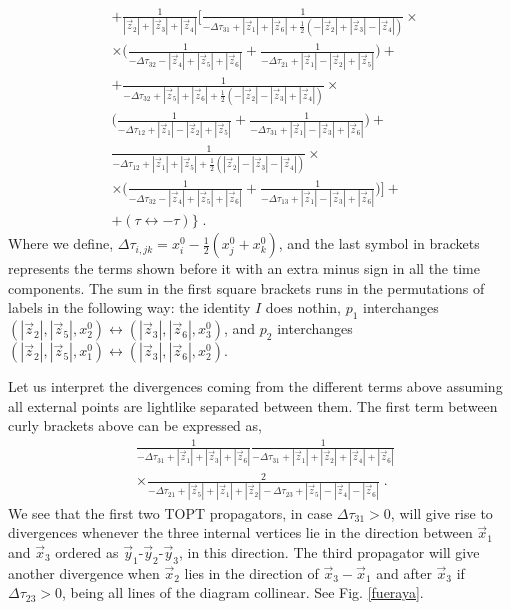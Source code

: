 \documentclass[%
 reprint,
 amsmath,amssymb,
 aps,
]{revtex4-1}
\begin{document}
\begin{align}
&+\frac{1}{|\vec{z}_2|+|\vec{z}_3|+|\vec{z}_4|}\Big[\frac{1}{-\Delta\tau_{31}+|\vec{z}_1|+|\vec{z}_6|+\frac{1}{2}(-|\vec{z}_2|+|\vec{z}_3|-|\vec{z}_4|)}\times\nonumber\\
&\times\Big(\frac{1}{-\Delta\tau_{32}-|\vec{z}_4|+|\vec{z}_5|+|\vec{z}_6|}+\frac{1}{-\Delta\tau_{21}+|\vec{z}_1|-|\vec{z}_2|+|\vec{z}_5|}\Big)+\nonumber\\
&+\frac{1}{-\Delta\tau_{32}+|\vec{z}_5|+|\vec{z}_6|+\frac{1}{2}(-|\vec{z}_2|-|\vec{z}_3|+|\vec{z}_4|)}\times\nonumber\\
&\Big(\frac{1}{-\Delta\tau_{12}+|\vec{z}_1|-|\vec{z}_2|+|\vec{z}_5|}+\frac{1}{-\Delta\tau_{31}+|\vec{z}_1|-|\vec{z}_3|+|\vec{z}_6|}\Big)+\nonumber\\
&\frac{1}{-\Delta\tau_{12}+|\vec{z}_1|+|\vec{z}_5|+\frac{1}{2}(|\vec{z}_2|-|\vec{z}_3|-|\vec{z}_4|)}\times\nonumber\\
&\times\Big(\frac{1}{-\Delta\tau_{32}-|\vec{z}_4|+|\vec{z}_5|+|\vec{z}_6|}+\frac{1}{-\Delta\tau_{13}+|\vec{z}_1|-|\vec{z}_3|+|\vec{z}_6|}\Big)\Big]+\nonumber\\
&+(\tau\leftrightarrow-\tau)\Big\}\;.\label{assuca}
 \end{align}
 Where we define, $\Delta\tau_{i,jk}=x_i^0-\frac{1}{2}(x_j^0+x_k^0)$, and the last symbol in brackets represents the terms shown before it with an extra minus sign in all the time components. The sum in the first square brackets runs in the permutations of labels in the following way: the identity $I$ does nothin, $p_1$ interchanges $(|\vec{z}_2|,|\vec{z}_5|,x_2^0)\leftrightarrow(|\vec{z}_3|, |\vec{z}_6|,x_3^0)$, and $p_2$ interchanges $(|\vec{z}_2|,|\vec{z}_5|,x_1^0)\leftrightarrow(|\vec{z}_3|, |\vec{z}_6|,x_2^0)$.\par
 Let us interpret the divergences coming from the different terms above assuming all external points are lightlike separated between them. The first term between curly brackets above can be expressed as,  
 \begin{align}
&\frac{1}{-\Delta\tau_{31}+|\vec{z}_1|+|\vec{z}_3|+|\vec{z}_6|}\frac{1}{-\Delta\tau_{31}+|\vec{z}_1|+|\vec{z}_2|+|\vec{z}_4|+|\vec{z}_6|}\nonumber\\
&\times\frac{2}{-\Delta\tau_{21}+|\vec{z}_5|+|\vec{z}_1|+|\vec{z}_2|-\Delta\tau_{23}+|\vec{z}_5|-|\vec{z}_4|-|\vec{z}_6|}\label{jejejeje}\;.
\end{align}
 We see that the first two TOPT propagators, in case $\Delta\tau_{31}>0$, will give rise to divergences whenever the three internal vertices lie in the direction between $\vec{x}_1$ and $\vec{x}_3$ ordered as $\vec{y}_1$-$\vec{y}_2$-$\vec{y}_3$, in this direction. The third propagator will give another divergence when $\vec{x}_2$ lies in the direction of $\vec{x}_3-\vec{x}_1$ and after $\vec{x}_3$ if $\Delta\tau_{23}>0$, being all lines of the diagram collinear. See Fig. \ref{fueraya}.
\end{document}
